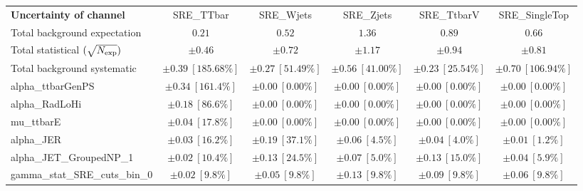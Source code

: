 
\begin{sidewaystable}
\begin{center}
\setlength{\tabcolsep}{0.0pc}
\begin{tabular*}{\textwidth}{@{\extracolsep{\fill}}lccccc}
\noalign{\smallskip}\hline\noalign{\smallskip}
{\bf Uncertainty of channel}                                    & SRE\_TTbar            & SRE\_Wjets            & SRE\_Zjets            & SRE\_TtbarV            & SRE\_SingleTop            \\
\noalign{\smallskip}\hline\noalign{\smallskip}
Total background expectation             &  $0.21$        &  $0.52$        &  $1.36$        &  $0.89$        &  $0.66$       \\
\noalign{\smallskip}\hline\noalign{\smallskip}
Total statistical $(\sqrt{N_{\rm exp}})$              & $\pm 0.46$        & $\pm 0.72$        & $\pm 1.17$        & $\pm 0.94$        & $\pm 0.81$       \\
Total background systematic               & $\pm 0.39\ [185.68\%] $        & $\pm 0.27\ [51.49\%] $        & $\pm 0.56\ [41.00\%] $        & $\pm 0.23\ [25.54\%] $        & $\pm 0.70\ [106.94\%] $             \\
\noalign{\smallskip}\hline\noalign{\smallskip}
\noalign{\smallskip}\hline\noalign{\smallskip}
alpha\_ttbarGenPS         & $\pm 0.34\ [161.4\%] $          & $\pm 0.00\ [0.00\%] $          & $\pm 0.00\ [0.00\%] $          & $\pm 0.00\ [0.00\%] $          & $\pm 0.00\ [0.00\%] $       \\
alpha\_RadLoHi         & $\pm 0.18\ [86.6\%] $          & $\pm 0.00\ [0.00\%] $          & $\pm 0.00\ [0.00\%] $          & $\pm 0.00\ [0.00\%] $          & $\pm 0.00\ [0.00\%] $       \\
mu\_ttbarE         & $\pm 0.04\ [17.8\%] $          & $\pm 0.00\ [0.00\%] $          & $\pm 0.00\ [0.00\%] $          & $\pm 0.00\ [0.00\%] $          & $\pm 0.00\ [0.00\%] $       \\
alpha\_JER         & $\pm 0.03\ [16.2\%] $          & $\pm 0.19\ [37.1\%] $          & $\pm 0.06\ [4.5\%] $          & $\pm 0.04\ [4.0\%] $          & $\pm 0.01\ [1.2\%] $       \\
alpha\_JET\_GroupedNP\_1         & $\pm 0.02\ [10.4\%] $          & $\pm 0.13\ [24.5\%] $          & $\pm 0.07\ [5.0\%] $          & $\pm 0.13\ [15.0\%] $          & $\pm 0.04\ [5.9\%] $       \\
gamma\_stat\_SRE\_cuts\_bin\_0         & $\pm 0.02\ [9.8\%] $          & $\pm 0.05\ [9.8\%] $          & $\pm 0.13\ [9.8\%] $          & $\pm 0.09\ [9.8\%] $          & $\pm 0.06\ [9.8\%] $       \\

\end{tabular*}
\end{center}
\end{sidewaystable}
